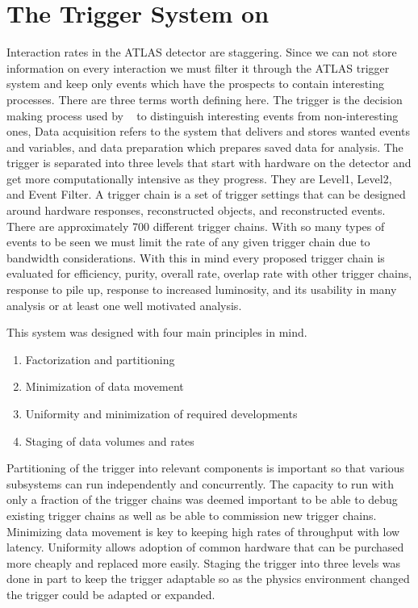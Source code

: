 
\chapter{The Trigger System on~\atlas}
\label{SECTION-TRIGGERS}

Interaction rates in the ATLAS detector are staggering. Since we can not store information on every interaction we must filter it through the ATLAS trigger system and keep only events which have the prospects to contain interesting processes. There are three terms worth defining here. The trigger is the decision making process used by \atlas~ to distinguish interesting events from non-interesting ones, Data acquisition refers to the system that delivers and stores wanted events and variables, and data preparation which prepares saved data for analysis. The trigger is separated into three levels that start with hardware on the detector and get more computationally intensive as they progress. They are Level1, Level2, and Event Filter. A trigger chain is a set of trigger settings that can be designed around hardware responses, reconstructed objects, and reconstructed events. There are approximately 700 different trigger chains. With so many types of events to be seen we must limit the rate of any given trigger chain due to bandwidth considerations. With this in mind every proposed trigger chain is evaluated for efficiency, purity, overall rate, overlap rate with other trigger chains, response to pile up, response to increased luminosity, and its usability in many analysis or at least one well motivated analysis. 

This system was designed with four main principles in mind. 

\begin{enumerate}
\item{Factorization and partitioning}
\item{Minimization of data movement}
\item{Uniformity and minimization of required developments}
\item{Staging of data volumes and rates}
\end{enumerate}

Partitioning of the trigger into relevant components is important so that various subsystems can run independently and concurrently. The capacity to run with only a fraction of the trigger chains was deemed important to be able to debug existing trigger chains as well as be able to commission new trigger chains. Minimizing data movement is key to keeping high rates of throughput with low latency. Uniformity allows adoption of common hardware that can be purchased more cheaply and replaced more easily. Staging the trigger into three levels was  done in part to keep the trigger adaptable so as the physics environment changed the trigger could be adapted or expanded. 

